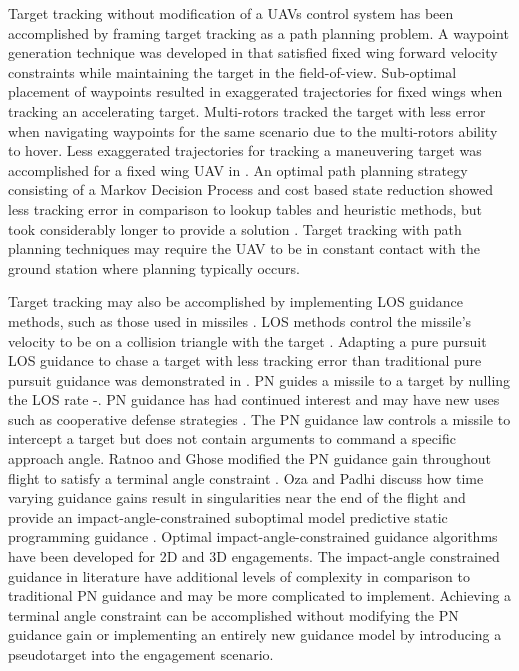 \documentclass[conference]{IEEEtran}
\begin{document}
Target tracking without modification of a UAVs control system has been accomplished by framing target tracking as a path planning problem. A waypoint generation technique was developed in \cite{ariyur_autonomous_2008} that satisfied fixed wing forward velocity constraints while maintaining the target in the field-of-view. Sub-optimal placement of waypoints resulted in exaggerated trajectories for fixed wings when tracking an accelerating target. Multi-rotors tracked the target with less error when navigating waypoints for the same scenario due to the multi-rotors ability to hover. Less exaggerated trajectories for tracking a maneuvering target was accomplished for a fixed wing UAV in \cite{lee_strategies_2003}.  An optimal path planning strategy consisting of a Markov Decision Process and cost based state reduction showed less tracking error in comparison to lookup tables and heuristic methods, but took considerably longer to provide a solution \cite{baek_optimal_2013}. Target tracking with path planning techniques may require the UAV to be in constant contact with the ground station where planning typically occurs.  

Target tracking may also be accomplished by implementing LOS guidance methods, such as those used in missiles \cite{zarchan}. LOS methods control the missile’s velocity to be on a collision triangle with the target \cite{shneydor1998missile,yanushevsky2007modern}. Adapting a pure pursuit LOS guidance to chase a target with less tracking error than traditional pure pursuit guidance was demonstrated in \cite{yamasaki_advanced_2009}. PN guides a missile to a target by nulling the LOS rate \cite{shneydor1998missile}-\cite{yanushevsky2007modern}. PN guidance has had continued interest and may have new uses such as cooperative defense strategies \cite{isaac}. The PN guidance law controls a missile to intercept a target but does not contain arguments to command a specific approach angle. Ratnoo and Ghose modified the PN guidance gain throughout flight to satisfy a terminal angle constraint \cite{ratnoo2009satisfying}. Oza and Padhi discuss how time varying guidance gains result in singularities near the end of the flight and provide an impact-angle-constrained suboptimal model predictive static programming guidance \cite{oza2012impact}. Optimal impact-angle-constrained guidance algorithms have been developed for 2D \cite{park2013optimal} and 3D \cite{kumar2014three} engagements. The impact-angle constrained guidance in literature have additional levels of complexity in comparison to traditional PN guidance and may be more complicated to implement. Achieving a terminal angle constraint can be accomplished without modifying the PN guidance gain or implementing an entirely new guidance model by introducing a pseudotarget into the engagement scenario.
\end{document}
